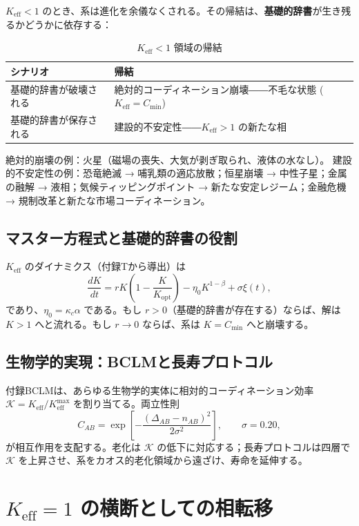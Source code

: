 \documentclass[12pt,a4paper]{article}
\newcommand{\Keff}{K_{\mathrm{eff}}}
\newcommand{\REL}{\mathcal{K}}
\begin{document}
	\(\Keff < 1\) のとき、系は進化を余儀なくされる。その帰結は、\textbf{基礎的辞書}が生き残るかどうかに依存する：
	
	\begin{table}[H]
		\centering
		\caption{\(\Keff < 1\) 領域の帰結}
		\begin{tabular}{p{5cm}p{8cm}}
			\toprule
			\textbf{シナリオ} & \textbf{帰結} \\
			\midrule
			基礎的辞書が破壊される & 絶対的コーディネーション崩壊――不毛な状態 (\(\Keff = C_{\min}\)) \\
			基礎的辞書が保存される & 建設的不安定性――\(\Keff > 1\) の新たな相 \\
			\bottomrule
		\end{tabular}
	\end{table}
	
	絶対的崩壊の例：火星（磁場の喪失、大気が剥ぎ取られ、液体の水なし）。
	建設的不安定性の例：恐竜絶滅 → 哺乳類の適応放散；恒星崩壊 → 中性子星；金属の融解 → 液相；気候ティッピングポイント → 新たな安定レジーム；金融危機 → 規制改革と新たな市場コーディネーション。
	
	\subsection{マスター方程式と基礎的辞書の役割}
	
	\(\Keff\) のダイナミクス（付録Tから導出）は
	\begin{equation}
		\frac{dK}{dt} = r K\left(1 - \frac{K}{K_{\mathrm{opt}}}\right) - \eta_0 K^{1-\beta} + \sigma \xi(t),
		\label{eq:master}
	\end{equation}
	であり、\(\eta_0 = \kappa_c \alpha\) である。もし \(r > 0\)（基礎的辞書が存在する）ならば、解は \(K > 1\) へと流れる。もし \(r \to 0\) ならば、系は \(K = C_{\min}\) へと崩壊する。
	
	\subsection{生物学的実現：BCLMと長寿プロトコル}
	
	付録BCLMは、あらゆる生物学的実体に相対的コーディネーション効率 \(\REL = \Keff/\Keff^{\max}\) を割り当てる。両立性則
	\[
	C_{AB} = \exp\!\left[-\frac{(\Delta_{AB} - n_{AB})^2}{2\sigma^2}\right],\qquad \sigma = 0.20,
	\]
	が相互作用を支配する。老化は \(\REL\) の低下に対応する；長寿プロトコルは四層で \(\REL\) を上昇させ、系をカオス的老化領域から遠ざけ、寿命を延伸する。
	
	\section{\(\Keff = 1\) の横断としての相転移}
	
\end{document}
